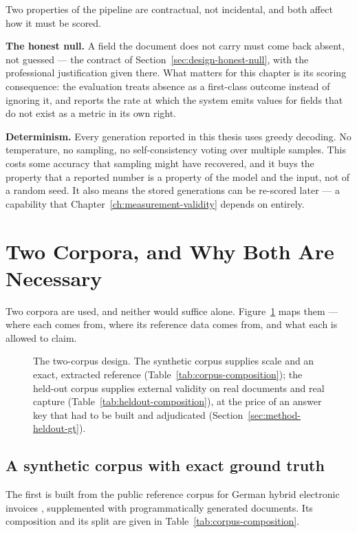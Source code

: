 Two properties of the pipeline are contractual, not incidental, and both affect how it
must be scored.

\textbf{The honest null.} A field the document does not carry must come back absent, not
guessed --- the contract of Section~\ref{sec:design-honest-null}, with the professional
justification given there. What matters for this chapter is its scoring consequence: the
evaluation treats absence as a first-class outcome instead of ignoring it, and reports the
rate at which the system emits values for fields that do not exist as a metric in its own
right.

\textbf{Determinism.} Every generation reported in this thesis uses greedy decoding. No
temperature, no sampling, no self-consistency voting over multiple samples. This costs some
accuracy that sampling might have recovered, and it buys the property that a reported number
is a property of the model and the input, not of a random seed. It also means the
stored generations can be re-scored later --- a capability that Chapter~\ref{ch:measurement-validity}
depends on entirely.

\section{Two Corpora, and Why Both Are Necessary}
\label{sec:method-data}

Two corpora are used, and neither would suffice alone. Figure~\ref{fig:corpus-map}
maps them --- where each comes from, where its reference data comes from, and what
each is allowed to claim.

\begin{figure}[htbp]
  \centering
  
  \caption[The two-corpus design]{The two-corpus design. The synthetic corpus supplies
  scale and an exact, extracted reference (Table~\ref{tab:corpus-composition}); the
  held-out corpus supplies external validity on real documents and real capture
  (Table~\ref{tab:heldout-composition}), at the price of an answer key that had to be
  built and adjudicated (Section~\ref{sec:method-heldout-gt}).}
  \label{fig:corpus-map}
\end{figure}

\subsection{A synthetic corpus with exact ground truth}

The first is built from the public reference corpus for German hybrid electronic invoices
\parencite{zugferdcorpus}, supplemented with programmatically generated documents. Its composition
and its split are given in Table~\ref{tab:corpus-composition}.

